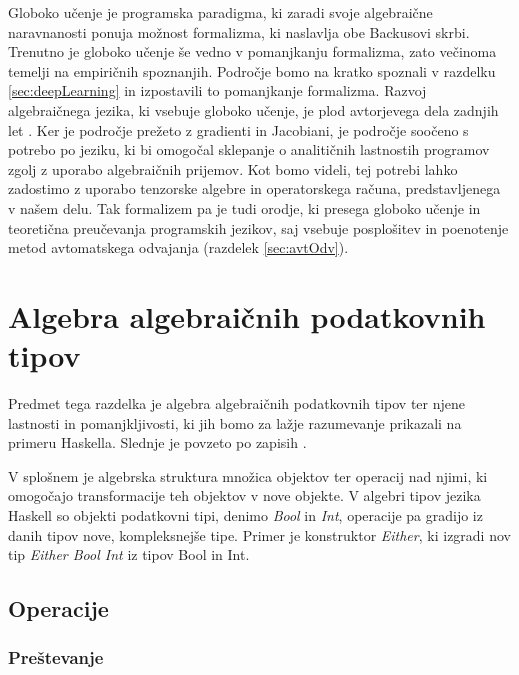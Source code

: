 \documentclass[a4paper, 12pt]{book}
\begin{document}
Globoko učenje je programska paradigma, ki zaradi svoje algebraične naravnanosti ponuja možnost formalizma, ki naslavlja obe Backusovi skrbi. Trenutno je globoko učenje še vedno v pomanjkanju formalizma, zato večinoma temelji na empiričnih spoznanjih. Področje bomo na kratko spoznali v razdelku \ref{sec:deepLearning} in izpostavili to pomanjkanje formalizma.
Razvoj algebraičnega jezika, ki vsebuje globoko učenje, je plod avtorjevega dela zadnjih let \cite{opCalProg} \cite{dC++Paper}. Ker je področje prežeto z gradienti in Jacobiani, je področje soočeno s potrebo po jeziku, ki bi omogočal sklepanje o analitičnih lastnostih programov zgolj z uporabo algebraičnih prijemov. Kot bomo videli, tej potrebi lahko zadostimo z uporabo tenzorske algebre in operatorskega računa, predstavljenega v našem delu.
Tak formalizem pa je tudi orodje, ki presega globoko učenje in teoretična preučevanja programskih jezikov, saj vsebuje posplošitev in poenotenje metod avtomatskega odvajanja (razdelek \ref{sec:avtOdv}).

\section{Algebra algebraičnih podatkovnih tipov}\label{algTp}

Predmet tega razdelka je algebra algebraičnih podatkovnih tipov ter njene lastnosti in pomanjkljivosti, ki jih bomo za lažje razumevanje prikazali na primeru Haskella. Slednje je povzeto po zapisih \cite{algTip}.

V splošnem je algebrska struktura množica objektov ter operacij nad njimi, ki omogočajo transformacije teh objektov v nove objekte. V algebri tipov jezika Haskell so objekti podatkovni tipi, denimo \emph{Bool} in \emph{Int}, operacije pa gradijo iz danih tipov nove, kompleksnejše tipe. Primer je konstruktor \emph{Either}, ki izgradi nov tip \emph{Either Bool Int} iz tipov Bool in Int.

\subsection{Operacije}

\subsubsection{Preštevanje}
\end{document}
